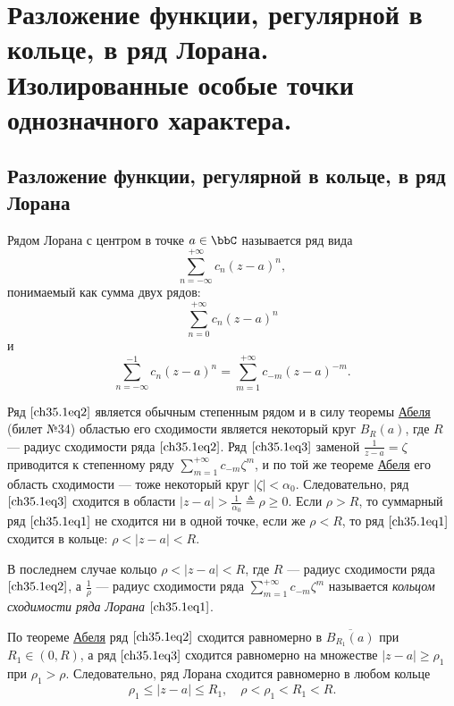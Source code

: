 \chapter{Разложение функции, регулярной в кольце, в ряд Лорана. Изолированные особые точки однозначного характера.}
\section{Разложение функции, регулярной в кольце, в ряд Лорана}

\begin{defn}
Рядом Лорана с центром в точке $a \in \bbC$ называется ряд вида
\begin{equation} \label{ch35.1eq1}
\sum\limits_{n = -\infty}^{+\infty} c_n (z - a)^n,
\end{equation}
понимаемый как сумма двух рядов:
\begin{equation} \label{ch35.1eq2}
\sum\limits_{n = 0}^{+\infty} c_n (z - a)^n
\end{equation}
и
\begin{equation} \label{ch35.1eq3}
\sum\limits_{n = -\infty}^{-1} c_n (z - a)^n = \sum\limits_{m = 1}^{+\infty} c_{-m} (z - a)^{-m}.
\end{equation}
\end{defn}

Ряд $\eqref{ch35.1eq2}$ является обычным степенным рядом и в силу теоремы \hyperref[ch34.2Thm1]{Абеля} (билет №34) областью его сходимости является некоторый круг $B_R(a)$, где $R$ --- радиус сходимости ряда $\eqref{ch35.1eq2}$. Ряд $\eqref{ch35.1eq3}$ заменой $\frac{1}{z - a} = \zeta$ приводится к степенному ряду $\sum\limits_{m = 1}^{+\infty}c_{-m} \zeta^m$, и по той же теореме \hyperref[ch34.2Thm1]{Абеля} его область сходимости --- тоже некоторый круг $|\zeta| < \alpha_0$. Следовательно, ряд $\eqref{ch35.1eq3}$ сходится в области $|z - a| > \frac{1}{\alpha_0} \triangleq \rho \ge 0$. Если $\rho > R$, то суммарный ряд $\eqref{ch35.1eq1}$ не сходится ни в одной точке, если же $\rho < R$, то ряд $\eqref{ch35.1eq1}$ сходится в кольце: $\rho < |z - a| < R$.

В последнем случае кольцо $\rho < |z - a| < R$, где $R$ --- радиус сходимости ряда $\eqref{ch35.1eq2}$, а $\frac{1}{\rho}$ --- радиус сходимости ряда $\sum\limits_{m = 1}^{+\infty} c_{-m} \zeta^m$ называется \textit{кольцом сходимости ряда Лорана} $\eqref{ch35.1eq1}$.

По теореме \hyperref[ch34.2Thm1]{Абеля} ряд $\eqref{ch35.1eq2}$ сходится равномерно в $\overline{B_{R_1}(a)}$ при 
$R_1 \in (0,R)$, а ряд $\eqref{ch35.1eq3}$ сходится равномерно на множестве $|z - a| \ge \rho_1$ при $\rho_1 > \rho$. Следовательно, ряд Лорана сходится равномерно в любом кольце
$$
\rho_1 \le |z - a| \le R_1, \quad \rho < \rho_1 < R_1 < R.
$$

